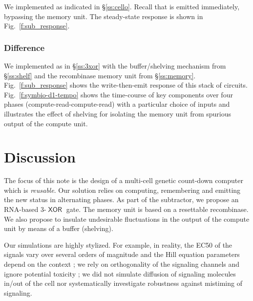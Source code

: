 \documentclass[12pt,notitlepage]{article}
\let\cite\citep
\newcommand{\XOR}{\ensuremath{\mathop{\mathsf{XOR}}}\xspace}
\begin{document}
We implemented 
as indicated in \S\ref{ss:cello}.
%
Recall that  is emitted immediately,
bypassing the memory unit.
%
The steady-state response is shown in Fig.~\ref{f:sub_response}.
%


\subsubsection*{Difference \texorpdfstring{}{d1}} \label{s:sim:bit1:d1}


We implemented 
as in \S\ref{ss:3xor}
with 
the buffer/shelving mechanism from \S\ref{ss:shelf}
and
the recombinase memory unit from \S\ref{ss:memory}.
%
%
Fig.~\ref{f:sub_response}
shows 
the write-then-emit response of this stack of circuits.
%
%
Fig.~\ref{f:symbio-d1-tempo} shows
the time-course of key components over four phases
(compute-read-compute-read)
with a particular choice of inputs
and
illustrates the effect of shelving
for isolating 
the memory unit
from spurious output of the compute unit.


%
%
%

\section{Discussion} \label{s:discussion}


The focus of this note is the design
of a multi-cell genetic count-down 
computer which is \emph{reusable}.
%
%
Our solution relies on
computing, remembering and emitting 
the new status in alternating phases. 
%
%
As part of the subtractor,
we propose an RNA-based 3-\XOR gate.
%
%
The memory unit is based on 
a resettable recombinase.
%
We also propose to
insulate undesirable fluctuations
in the output of the compute unit
by means of a buffer (shelving).

%
%

Our simulations are highly stylized.
%
%
For example,
in reality,
the EC50 of the signals
vary over several orders of magnitude
\cite[SM:Fig.8]{DuETAL2020}
and
the Hill equation parameters depend on the context
\cite[SM:p.10]{NielsenETAL2016};
we rely on orthogonality of the signaling channels
and ignore 
potential toxicity
\cite[SM:p.8]{DuETAL2020};
we did not simulate diffusion 
of signaling molecules 
in/out of the cell
nor systematically investigate
robustness against mistiming of signaling.
%




\end{document}
